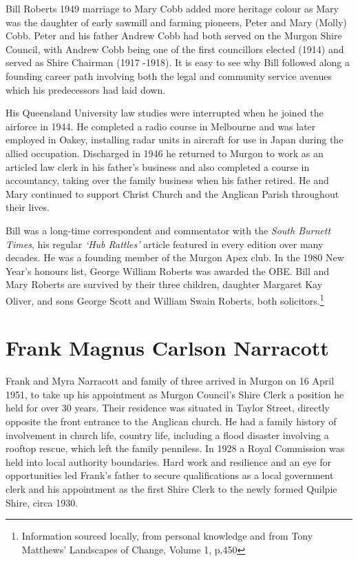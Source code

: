 Bill Roberts 1949 marriage to Mary Cobb added more heritage colour as Mary was the daughter of early sawmill and farming pioneers, Peter and Mary (Molly) Cobb. Peter and his father Andrew Cobb had both served on the Murgon Shire Council, with Andrew Cobb being one of the first councillors elected (1914) and served as Shire Chairman (1917 -1918). It is easy to see why Bill followed along a founding career path involving both the legal and community service avenues which his predecessors had laid down.



His Queensland University law studies were interrupted when he joined the airforce in 1944. He completed a radio course in Melbourne and was later employed in Oakey, installing radar units in aircraft for use in Japan during the allied occupation. Discharged in 1946 he returned to Murgon to work as an articled law clerk in his father's business and also completed a course in accountancy, taking over the family business when his father retired. He and Mary continued to support Christ Church and the Anglican Parish throughout their lives.



Bill was a long-time correspondent and commentator with the \emph{South Burnett Times}, his regular \emph{`Hub Rattles'} article featured in every edition over many decades. He was a founding member of the Murgon Apex club. In the 1980 New Year's honours list, George William Roberts was awarded the OBE. Bill and Mary Roberts are survived by their three children, daughter Margaret Kay Oliver, and sons George Scott and William Swain Roberts, both solicitors.\footnote{Information sourced locally, from personal knowledge and from Tony Matthews' Landscapes of Change, Volume 1, p.450}


\section{Frank Magnus Carlson Narracott}



Frank and Myra Narracott and family of three arrived in Murgon on 16 April 1951, to take up his appointment as Murgon Council's Shire Clerk a position he held for over 30 years. Their residence was situated in Taylor Street, directly opposite the front entrance to the Anglican church. He had a family history of involvement in church life, country life, including a flood disaster involving a rooftop rescue, which left the family penniless. In 1928 a Royal Commission was held into local authority boundaries. Hard work and resilience and an eye for opportunities led Frank's father to secure qualifications as a local government clerk and his appointment as the first Shire Clerk to the newly formed Quilpie Shire, circa 1930.



